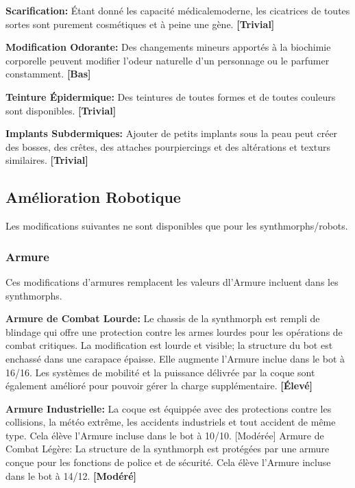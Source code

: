 \textbf{Scarification:} Étant donné les capacité médicalemoderne, les cicatrices de toutes sortes sont purement cosmétiques et à peine une gène. \textbf{[Trivial]} 

\textbf{Modification Odorante:} Des changements mineurs apportés à la biochimie corporelle peuvent modifier l'odeur naturelle d'un personnage ou le parfumer constamment. \textbf{[Bas]} 

\textbf{Teinture Épidermique:} Des teintures de toutes formes et de toutes couleurs sont disponibles. \textbf{[Trivial]} 

\textbf{Implants Subdermiques:} Ajouter de petits implants sous la peau peut créer des bosses, des crêtes, des attaches pourpiercings et des altérations et texturs similaires. \textbf{[Trivial]} 



\subsection{Amélioration Robotique} \label{sec:robotic-enhancements} 

Les modifications suivantes ne sont disponibles que pour les synthmorphs/robots. 

\subsubsection{Armure} 

Ces modifications d'armures remplacent les valeurs dl'Armure incluent dans les synthmorphs. 

\textbf{Armure de Combat Lourde:} Le chassis de la synthmorph est rempli de blindage qui offre une protection contre les armes lourdes pour les opérations de combat critiques. La modification est lourde et visible; la structure du bot est enchassé dans une carapace épaisse. Elle augmente l'Armure inclue dans le bot à 16/16. Les systèmes de mobilité et la puissance délivrée par la coque sont également amélioré pour pouvoir gérer la charge supplémentaire. \textbf{[Élevé]} 

\textbf{Armure Industrielle:} La coque est équippée avec des protections contre les collisions, la météo extrême, les accidents industriels et tout accident de même type. Cela élève l'Armure incluse dans le bot à 10/10. [Modérée] Armure de Combat Légère: La structure de la synthmorph est protégées par une armure conçue pour les fonctions de police et de sécurité. Cela élève l'Armure incluse dans le bot à 14/12. \textbf{[Modéré]} 

